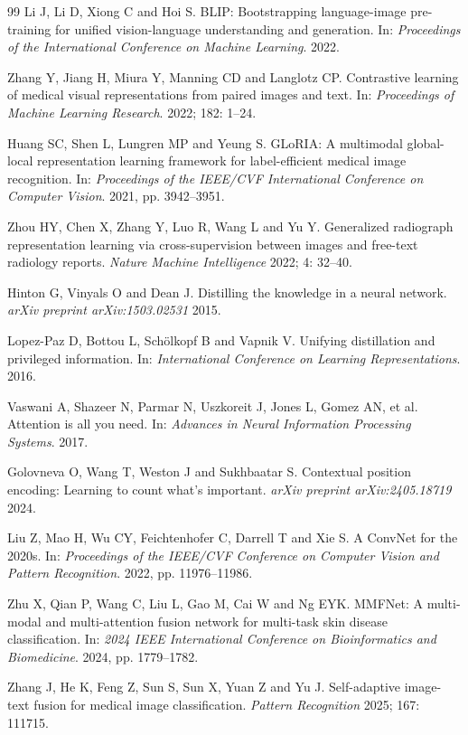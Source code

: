 \documentclass[Afour,sagev,times]{sagej}
\begin{document}
\begin{thebibliography}{99}
Li J, Li D, Xiong C and Hoi S. BLIP: Bootstrapping language-image pre-training for unified vision-language understanding and generation. In: \textit{Proceedings of the International Conference on Machine Learning}. 2022.

Zhang Y, Jiang H, Miura Y, Manning CD and Langlotz CP. Contrastive learning of medical visual representations from paired images and text. In: \textit{Proceedings of Machine Learning Research}. 2022; 182: 1--24.

Huang SC, Shen L, Lungren MP and Yeung S. GLoRIA: A multimodal global-local representation learning framework for label-efficient medical image recognition. In: \textit{Proceedings of the IEEE/CVF International Conference on Computer Vision}. 2021, pp. 3942--3951.

Zhou HY, Chen X, Zhang Y, Luo R, Wang L and Yu Y. Generalized radiograph representation learning via cross-supervision between images and free-text radiology reports. \textit{Nature Machine Intelligence} 2022; 4: 32--40.

Hinton G, Vinyals O and Dean J. Distilling the knowledge in a neural network. \textit{arXiv preprint arXiv:1503.02531} 2015.

Lopez-Paz D, Bottou L, Schölkopf B and Vapnik V. Unifying distillation and privileged information. In: \textit{International Conference on Learning Representations}. 2016.

Vaswani A, Shazeer N, Parmar N, Uszkoreit J, Jones L, Gomez AN, et al. Attention is all you need. In: \textit{Advances in Neural Information Processing Systems}. 2017.

Golovneva O, Wang T, Weston J and Sukhbaatar S. Contextual position encoding: Learning to count what's important. \textit{arXiv preprint arXiv:2405.18719} 2024.

Liu Z, Mao H, Wu CY, Feichtenhofer C, Darrell T and Xie S. A ConvNet for the 2020s. In: \textit{Proceedings of the IEEE/CVF Conference on Computer Vision and Pattern Recognition}. 2022, pp. 11976--11986.

Zhu X, Qian P, Wang C, Liu L, Gao M, Cai W and Ng EYK. MMFNet: A multi-modal and multi-attention fusion network for multi-task skin disease classification. In: \textit{2024 IEEE International Conference on Bioinformatics and Biomedicine}. 2024, pp. 1779--1782.

Zhang J, He K, Feng Z, Sun S, Sun X, Yuan Z and Yu J. Self-adaptive image-text fusion for medical image classification. \textit{Pattern Recognition} 2025; 167: 111715.


\end{thebibliography}
\end{document}
